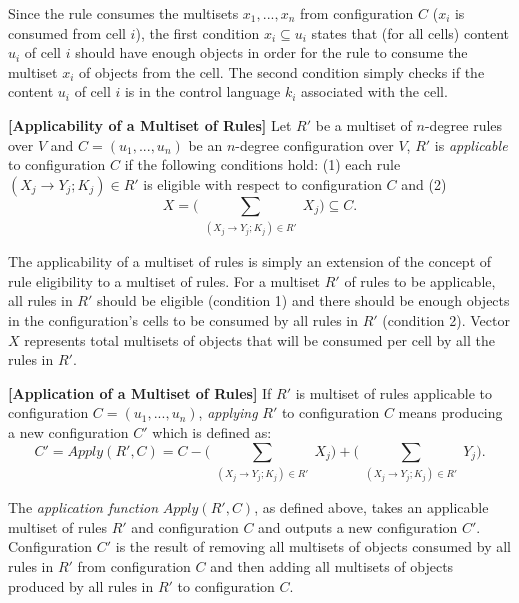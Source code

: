 \documentclass[a4paper]{article}
\theoremstyle{definition}
\newcommand{\ra}{\rightarrow}
\begin{document}
Since the rule consumes the multisets $x_1,...,x_n$ from configuration $C$ ($x_i$ is consumed from
cell $i$), the first condition $x_i \subseteq u_i$ states that (for all cells) content $u_i$ of cell
$i$ should have enough objects in order for the rule to consume the multiset $x_i$ of objects from
the cell. The second condition simply checks if the content $u_i$ of cell $i$ is in the control
language $k_i$ associated with the cell.


\label{def-appc} \textbf{[Applicability of a Multiset of Rules]} Let $R'$ be a multiset 
of $n$-degree rules over $V$ and $C = (u_1,...,u_n)$ be an $n$-degree configuration over $V$, $R'$ 
is \emph{applicable} to configuration $C$ if the following conditions hold: (1) each rule 
$(X_j \ra Y_j;K_j) \in R'$ is eligible with respect to configuration $C$ and (2) 
$$X = \Bigg(\sum_{\substack{(X_j \ra Y_j; K_j) \in R'}} X_j\Bigg)\subseteq C.$$

The applicability of a multiset of rules is simply an extension of the concept of rule eligibility
to a multiset of rules. For a multiset $R'$ of rules to be applicable, all rules in $R'$ should
be eligible (condition 1) and there should be enough objects in the configuration's cells to be 
consumed by all rules in $R'$ (condition 2). Vector $X$ represents total multisets of objects that 
will be consumed per cell by all the rules in $R'$.


\label{def-appl} \textbf{[Application of a Multiset of Rules]} If $R'$ is multiset of 
rules applicable to configuration $C = (u_1,...,u_n)$, \emph{applying} $R'$ to configuration $C$ 
means producing a new configuration $C'$ which is defined as: 
$$C' = Apply(R',C) =  C - \Bigg(\sum_{\substack{(X_j \ra Y_j; K_j) \in R'}} X_j\Bigg) +
\Bigg(\sum_{\substack{(X_j \ra Y_j; K_j) \in R'}} Y_j\Bigg).$$

The \emph{application function} $Apply(R',C)$, as defined above, takes an applicable multiset of 
rules $R'$ and configuration $C$ and outputs a new configuration $C'$. Configuration $C'$ is the 
result of removing all multisets of objects consumed by all rules in $R'$ from configuration $C$ and 
then adding all multisets of objects produced by all rules in $R'$ to configuration $C$.
\end{document}
